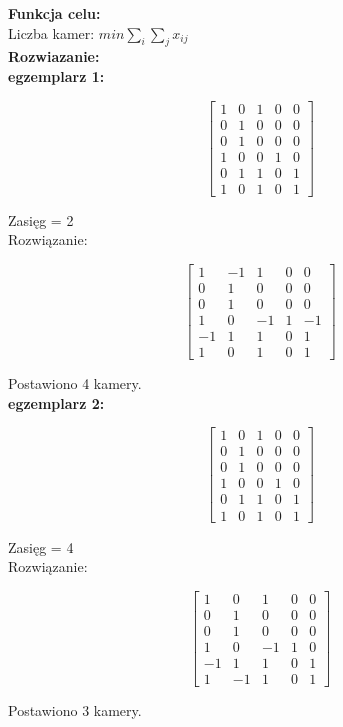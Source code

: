 \documentclass[15pt, a4paper]{article}
\begin{document}
\noindent\textbf{Funkcja celu:}\\

Liczba kamer: \(min \sum_{i}\sum_{j}x_{ij} \)\\

\noindent\textbf{Rozwiazanie:}\\ 

\textbf{egzemplarz 1:}


\[
\begin{bmatrix}
1 & 0 & 1 & 0 & 0 \\
0 & 1 & 0 & 0 & 0 \\
0 & 1 & 0 & 0 & 0 \\
1 & 0 & 0 & 1 & 0 \\
0 & 1 & 1 & 0 & 1 \\
1 & 0 & 1 & 0 & 1
\end{bmatrix}
\]

Zasięg = 2 \\

Rozwiązanie:

\[
\begin{bmatrix}
1 & -1 & 1 & 0 & 0 \\
0 & 1 & 0 & 0 & 0 \\
0 & 1 & 0 & 0 & 0 \\
1 & 0 & -1 & 1 & -1 \\
-1 & 1 & 1 & 0 & 1 \\
1 & 0 & 1 & 0 & 1
\end{bmatrix}
\]

Postawiono 4 kamery. \\


\textbf{egzemplarz 2:}

\[
\begin{bmatrix}
1 & 0 & 1 & 0 & 0 \\
0 & 1 & 0 & 0 & 0 \\
0 & 1 & 0 & 0 & 0 \\
1 & 0 & 0 & 1 & 0 \\
0 & 1 & 1 & 0 & 1 \\
1 & 0 & 1 & 0 & 1
\end{bmatrix}
\]

Zasięg = 4 \\

Rozwiązanie:

\[
\begin{bmatrix}
1 & 0 & 1 & 0 & 0 \\
0 & 1 & 0 & 0 & 0 \\
0 & 1 & 0 & 0 & 0 \\
1 & 0 & -1 & 1 & 0 \\
-1 & 1 & 1 & 0 & 1 \\
1 & -1 & 1 & 0 & 1
\end{bmatrix}
\]

Postawiono 3 kamery.

\vspace{0.5cm}
\end{document}
